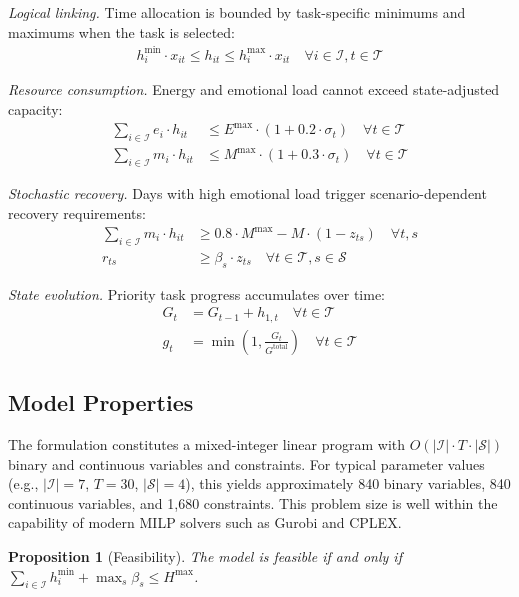 \documentclass[preprint,review,11pt]{elsarticle}
\newtheorem{proposition}{Proposition}
\begin{document}
\textit{Logical linking.} Time allocation is bounded by task-specific minimums and maximums when the task is selected:
\begin{align}
h_i^{\min} \cdot x_{it} \leq h_{it} \leq h_i^{\max} \cdot x_{it} \quad \forall i \in \mathcal{I}, t \in \mathcal{T}
\end{align}

\textit{Resource consumption.} Energy and emotional load cannot exceed state-adjusted capacity:
\begin{align}
\sum_{i \in \mathcal{I}} e_i \cdot h_{it} &\leq E^{\max} \cdot (1 + 0.2 \cdot \sigma_t) \quad \forall t \in \mathcal{T} \\
\sum_{i \in \mathcal{I}} m_i \cdot h_{it} &\leq M^{\max} \cdot (1 + 0.3 \cdot \sigma_t) \quad \forall t \in \mathcal{T}
\end{align}

\textit{Stochastic recovery.} Days with high emotional load trigger scenario-dependent recovery requirements:
\begin{align}
\sum_{i \in \mathcal{I}} m_i \cdot h_{it} &\geq 0.8 \cdot M^{\max} - M \cdot (1 - z_{ts}) \quad \forall t, s \\
r_{ts} &\geq \beta_s \cdot z_{ts} \quad \forall t \in \mathcal{T}, s \in \mathcal{S}
\end{align}

\textit{State evolution.} Priority task progress accumulates over time:
\begin{align}
G_t &= G_{t-1} + h_{1,t} \quad \forall t \in \mathcal{T} \\
g_t &= \min\left(1, \frac{G_t}{G^{\text{total}}}\right) \quad \forall t \in \mathcal{T}
\end{align}

\subsection{Model Properties}

The formulation constitutes a mixed-integer linear program with $O(|\mathcal{I}| \cdot T \cdot |\mathcal{S}|)$ binary and continuous variables and constraints. For typical parameter values (e.g., $|\mathcal{I}| = 7$, $T = 30$, $|\mathcal{S}| = 4$), this yields approximately 840 binary variables, 840 continuous variables, and 1,680 constraints. This problem size is well within the capability of modern MILP solvers such as Gurobi and CPLEX.

\begin{proposition}[Feasibility]
The model is feasible if and only if $\sum_{i \in \mathcal{I}} h_i^{\min} + \max_s \beta_s \leq H^{\max}$.
\end{proposition}
\end{document}
